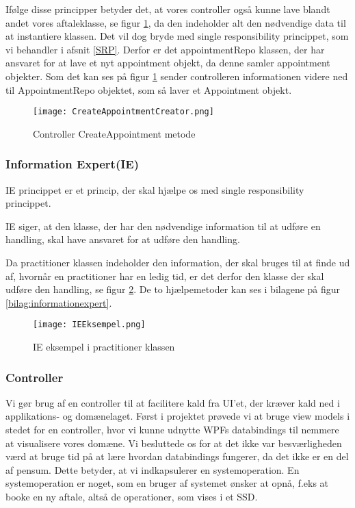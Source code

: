 Ifølge disse principper betyder det, at vores controller også kunne lave blandt andet vores aftaleklasse, se figur \ref{fig:controllerCreator}, da den indeholder alt den nødvendige data til at instantiere klassen.
Det vil dog bryde med single responsibility princippet, som vi behandler i afsnit \ref{SRP}.
Derfor er det appointmentRepo klassen, der har ansvaret for at lave et nyt appointment objekt, da denne samler appointment objekter.
Som det kan ses på figur \ref{fig:controllerCreator} sender controlleren informationen videre ned til AppointmentRepo objektet, som så laver et Appointment objekt.

\begin{figure}[h]
    \caption{Controller CreateAppointment metode}
    \centering
        \texttt{[image: CreateAppointmentCreator.png]}
    \label{fig:controllerCreator}
\end{figure}

\subsubsection{Information Expert(IE)}
IE princippet er et princip, der skal hjælpe os med single responsibility princippet.

IE siger, at den klasse, der har den nødvendige information til at udføre en handling, skal have ansvaret for at udføre den handling.\cite{solid}

Da practitioner klassen indeholder den information, der skal bruges til at finde ud af, hvornår en practitioner har en ledig tid, er det derfor den klasse der skal udføre den handling, se figur \ref{fig:informationexpert}.
De to hjælpemetoder kan ses i bilagene på figur \ref{bilag:informationexpert}.

\begin{figure}[h]
    \caption{IE eksempel i practitioner klassen}
    \centering
        \texttt{[image: IEEksempel.png]}
    \label{fig:informationexpert}
\end{figure}

\subsubsection{Controller}
\label{controller}
Vi gør brug af en controller til at facilitere kald fra UI'et, der kræver kald ned i applikations- og domænelaget.
Først i projektet prøvede vi at bruge view models i stedet for en controller, hvor vi kunne udnytte WPFs databindings til nemmere at visualisere vores domæne.
Vi besluttede os for at det ikke var besværligheden værd at bruge tid på at lære hvordan databindings fungerer, da det ikke er en del af pensum.
Dette betyder, at vi indkapsulerer en systemoperation.
En systemoperation er noget, som en bruger af systemet ønsker at opnå, f.eks at booke en ny aftale, altså de operationer, som vises i et SSD.

